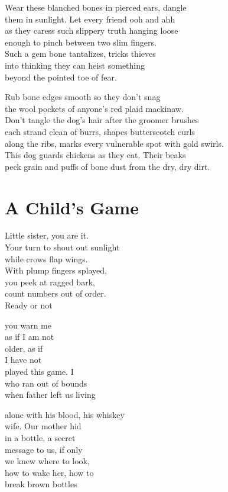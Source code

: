 \documentclass[twoside,10pt]{book}
\begin{document}
Wear these blanched bones in pierced ears, dangle\\
them in sunlight. Let every friend ooh and ahh\\
as they caress such slippery truth hanging loose\\
enough to pinch between two slim fingers.\\
Such a gem bone tantalizes, tricks thieves\\
into thinking they can heist something\\
beyond the pointed toe of fear.

Rub bone edges smooth so they don't snag\\
the wool pockets of anyone's red plaid mackinaw.\\
Don't tangle the dog's hair after the groomer brushes\\
each strand clean of burrs, shapes butterscotch curls\\
along the ribs, marks every vulnerable spot with gold swirls.\\
This dog guards chickens as they eat. Their beaks\\
peck grain and puffs of bone dust from the dry, dry dirt.


\clearpage
\section{A Child's Game}

Little sister, you are it.\\
Your turn to shout out sunlight\\
while crows flap wings.\\
With plump fingers splayed,\\
you peek at ragged bark,\\
count numbers out of order.\\
Ready or not

you warn me\\
as if I am not\\
older, as if\\
I have not\\
played this game. I\\
who ran out of bounds\\
when father left us living

alone with his blood, his whiskey\\
wife. Our mother hid\\
in a bottle, a secret\\
message to us, if only\\
we knew where to look,\\
how to wake her, how to\\
break brown bottles
\end{document}
